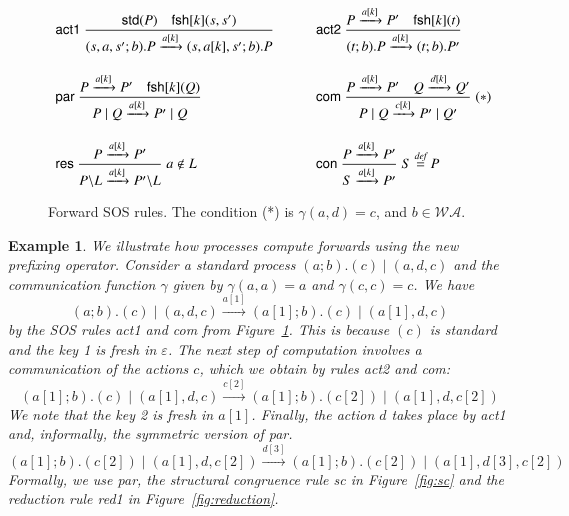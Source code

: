 \documentclass[review]{elsarticle}
\newcommand{\paral}{\; \vert \;}
\newcommand{\Rule}[2]{\displaystyle{\frac{#1}{#2}}}
\newcommand{\rom}[1]{\mbox{\rm{#1}}}
\newcommand{\std}[1]{\mathsf{std}(#1)}
\newcommand{\fresh}[2]{\mathsf{fsh}[#1](#2)}
\newcommand{\bydef}{\stackrel{\emph{def}}{=}}
\newcommand{\rulename}[1]{\textsf{#1}}
\newtheorem{example}{Example}
\begin{document}
\begin{figure}[t] 
\[
\begin{array}{ll}
\rulename{act1}\ 
\Rule
{\std{P} \quad \fresh{k}{s,s'}}
{(s,a,s';b).P \xrightarrow{a[k]}(s,a[k],s';b).P}
\qquad &
\rulename{act2}\
\Rule
{P \xrightarrow{a[k]} P' \quad \fresh{k}{t}}
{(t;b).P \xrightarrow{a[k]} (t;b).P'}
\\[25pt]
\rulename{par}\
\Rule
{P \xrightarrow{a[k]} P'\quad \fresh{k}{Q}}
{P \paral Q \xrightarrow{a[k]} P' \paral Q}
\qquad &
\rulename{com}\
\Rule
{P \xrightarrow{a[k]} P' \quad Q \xrightarrow{d[k]} Q'}
{P \paral Q \xrightarrow{c[k]} P' \paral Q'}
\; (*)
%
\\[25pt]
\rulename{res}\
\Rule
{P \xrightarrow{a[k]} P'}
{P\backslash L \xrightarrow{a[k]} P'\backslash L}
\; a \notin L
\qquad &
\rulename{con}\
\Rule
{P \xrightarrow{a[k]} P'}
{S \xrightarrow{a[k]} P'}
\; S \bydef P
\end{array}
\] 
\caption{Forward SOS rules. The condition (*) is $\gamma(a,d)=c$, 
and $b \in \mathcal{WA}$.} \label{fig:fsos}
\end{figure}
\begin{example}
{\rm
We illustrate how processes compute forwards using the new prefixing operator. Consider a standard
process $(a;b).(c) \paral (a,d,c)$ and the communication function $\gamma$ given by $\gamma(a,a)=a$ 
and $\gamma(c,c)=c$. We have
$$(a;b).(c) \paral  (a,d,c) \xrightarrow{a[1]} (a[1];b).(c) \paral  (a[1],d,c)$$
by the SOS rules \rulename{act1} and \rulename{com} from Figure~\ref{fig:fsos}. This is because $(c)$ 
is standard and the key 1 is fresh in $\varepsilon$. The next step of computation involves a communication of
the actions $c$, which we obtain by rules \rulename{act2} and \rulename{com}:
$$(a[1];b).(c) \paral  (a[1],d,c) \xrightarrow{c[2]} (a[1];b).(c[2]) \paral  (a[1],d,c[2])$$
We note that the key 2 is fresh in $a[1]$. Finally, the action $d$ takes place by \rulename{act1} and,
informally, the symmetric version of \rulename{par}.
$$(a[1];b).(c[2]) \paral  (a[1],d,c[2]) \xrightarrow{d[3]} (a[1];b).(c[2]) \paral  (a[1],d[3],c[2])$$
Formally, we use \rulename{par}, the structural congruence rule \rulename{sc} in Figure~\ref{fig:sc}
and the reduction rule \rulename{red1} in Figure~\ref{fig:reduction}.
}
\end{example}
\end{document}
